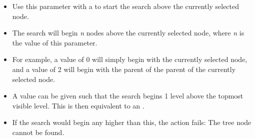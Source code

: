% 
\begin{itemize}
\item Use this parameter with a  to start the search above the currently selected node.
\item The search will begin \emph{n} nodes above the currently selected node, where \emph{n} is the value of this parameter.
\item For example, a value of 0 will simply begin with the currently selected node, and a value of 2 will begin with the parent of the parent of the currently selected node.
\item A value can be given such that the search begins 1 level above the topmost visible level. This is then equivalent to an .
\item If the search would begin any higher than this, the action fails: The tree node cannot be found.
\end{itemize}

\normalsize \latex{ \end{adjustwidth} }
\latex{\begin{adjustwidth}{.5cm}{.5cm}}%
\footnotesize%